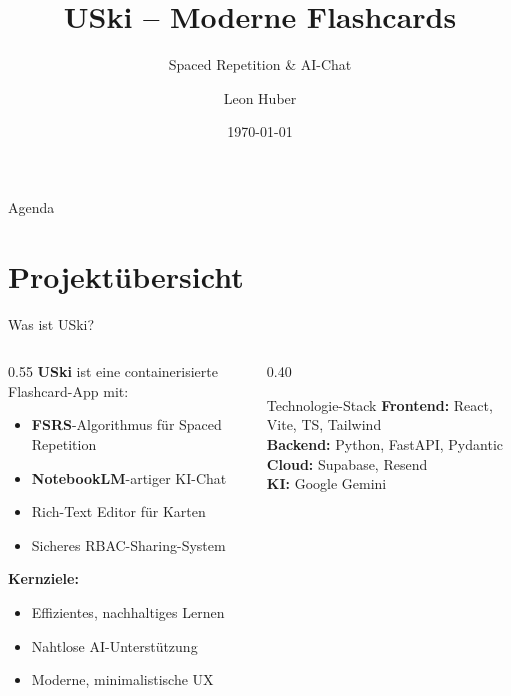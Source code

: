 \documentclass[aspectratio=169,11pt]{beamer}
\title{USki -- Moderne Flashcards}
\subtitle{Spaced Repetition \& AI-Chat}
\author{Leon Huber}
\date{\today}
\institute{HTBLuVA Salzburg}
\begin{document}
\begin{frame}[plain]
  \titlepage
\end{frame}

\begin{frame}{Agenda}
  \tableofcontents
\end{frame}

\section{Projektübersicht}

\begin{frame}{Was ist USki?}
  \begin{columns}[T]
    \begin{column}{0.55\textwidth}
      \textbf{USki} ist eine containerisierte Flashcard-App mit:
      \begin{itemize}
        \item \textbf{FSRS}-Algorithmus für Spaced Repetition
        \item \textbf{NotebookLM}-artiger KI-Chat
        \item Rich-Text Editor für Karten
        \item Sicheres RBAC-Sharing-System
      \end{itemize}
      \vspace{8pt}
      \textbf{Kernziele:}
      \begin{itemize}
        \item Effizientes, nachhaltiges Lernen
        \item Nahtlose AI-Unterstützung
        \item Moderne, minimalistische UX
      \end{itemize}
    \end{column}
    \begin{column}{0.40\textwidth}
      \begin{block}{Technologie-Stack}
        \textbf{Frontend:} React, Vite, TS, Tailwind\\[4pt]
        \textbf{Backend:} Python, FastAPI, Pydantic\\[4pt]
        \textbf{Cloud:} Supabase, Resend\\[4pt]
        \textbf{KI:} Google Gemini
      \end{block}
    \end{column}
  \end{columns}
\end{frame}
\end{document}
